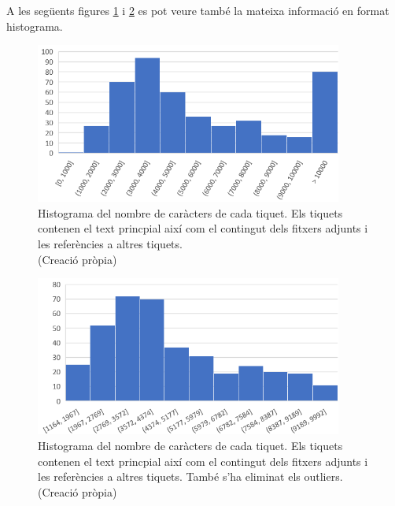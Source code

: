 A les següents figures \ref{fig:histograma_num_chars_adj_refs} i \ref{fig:histograma_num_chars_adj_refs_outliers} es pot veure també la mateixa informació en format histograma.

\begin{figure}[H]
    \centering
    \includegraphics[width=0.9\textwidth]{histograma_num_chars_adj_refs.png}
    \caption[Histograma dels caràcters de cada tiquet amb adjunts i referències]{Histograma del nombre de caràcters de cada tiquet. Els tiquets contenen el text princpial així com el contingut dels fitxers adjunts i les referències a altres tiquets. \\ (Creació pròpia)}
    \label{fig:histograma_num_chars_adj_refs}
\end{figure}

 
\begin{figure}[H]
    \centering
    \includegraphics[width=0.9\textwidth]{histograma_num_chars_adj_refs_outliers.png}
    \caption[Histograma dels caràcters de cada tiquet amb adjunts i referències i sense outliers]{Histograma del nombre de caràcters de cada tiquet. Els tiquets contenen el text princpial així com el contingut dels fitxers adjunts i les referències a altres tiquets. També s'ha eliminat els outliers. \\ (Creació pròpia)}
    \label{fig:histograma_num_chars_adj_refs_outliers}
\end{figure}


